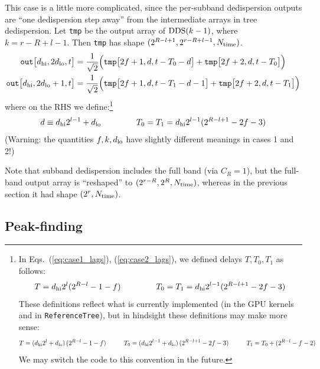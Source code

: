 \documentclass{article}
\numberwithin{equation}{section}   %
\def\DDS{{\rm DDS}}
\def\nn{\nonumber}
\begin{document}
\begin{itemize}
This case is a little more complicated, since the per-subband dedispersion outputs are ``one dedispersion step away''
from the intermediate arrays in tree dedispersion.
Let \verb|tmp| be the output array of $\DDS(k-1)$, where $k=r-R+l-1$. 
Then \verb|tmp| has shape $(2^{R-l+1}, 2^{r-R+l-1}, N_{\rm time})$.
\begin{align}
{\tt out}\big[ d_{\rm hi}, 2 d_{\rm lo}, t \big] 
  &= \frac{1}{\sqrt{2}} \Big( {\tt tmp}\big[ 2f+1, d, t - T_0 - d \big] + {\tt tmp}\big[ 2f+2, d, t - T_0 \big] \Big) \nn \\
{\tt out}\big[ d_{\rm hi}, 2 d_{\rm lo} + 1, t \big] 
  &= \frac{1}{\sqrt{2}} \Big( {\tt tmp}\big[ 2f+1, d, t - T_1 - d - 1 \big] + {\tt tmp}\big[ 2f+2, d, t - T_1 \big] \Big) 
\end{align}
where on the RHS we define:\footnote{In 
 Eqs.\ (\ref{eq:case1_lags}), (\ref{eq:case2_lags}),
 we defined delays $T,T_0,T_1$ as follows:
 \begin{equation}
 T = d_{\rm hi} 2^l (2^{R-l}-1-f) \hspace{1.5cm}
   T_0 = T_1 = d_{\rm hi} 2^{l-1} (2^{R-l+1} - 2f - 3)
 \end{equation}
 These definitions reflect what is currently implemented (in the GPU kernels and in {\tt ReferenceTree}), 
 but in hindsight these definitions may make more sense:
 \begin{equation}
  T = (d_{\rm hi} 2^l + d_{\rm lo}) \,(2^{R-l}-1-f)
 \hspace{1cm}
 T_0 = (d_{\rm hi} 2^{l-1} + d_{\rm lo}) \, (2^{R-l+1}-2f-3)
 \hspace{1cm}
 T_1 = T_0 + (2^{R-l}-f-2)
\end{equation}
We may switch the code to this convention in the future.}
\begin{equation}
d \equiv d_{\rm hi} 2^{l-1} + d_{\rm lo}
  \hspace{1.5cm} T_0 = T_1 = d_{\rm hi} 2^{l-1} (2^{R-l+1} - 2f - 3)
\label{eq:case2_lags}
\end{equation}
(Warning: the quantities $f,k,d_{\rm lo}$ have slightly different meanings in cases 1 and 2!)

\end{itemize}
Note that subband dedispersion includes the full band (via $C_R=1$), but the full-band output array is
``reshaped'' to $(2^{r-R}, 2^R, N_{\rm time})$, whereas in the previous section it had shape $(2^r, N_{\rm time})$.

\subsection{Peak-finding}
\label{sec:peak_finding}
\end{document}
